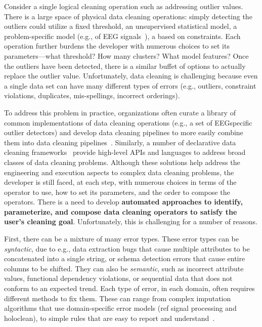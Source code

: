 Consider a single logical cleaning operation such as addressing outlier values.  There is a large space of physical data cleaning operations: simply detecting the outliers could utilize a fixed threshold, an unsupervised statistical model, a problem-specific model (e.g., of EEG signals~\cite{}), a based on constraints.  Each operation further burdens the developer with numerous choices to set its parameters---what threshold?  How many clusters? What model features?   Once the outliers have been detected, there is a similar buffet of options to actually replace the outlier value.     Unfortunately, data cleaning is challenging because even a single data set can have many different types of errors (e.g., outliers, constraint violations, duplicates, mis-spellings, incorrect orderings).

To address this problem in practice, organizations often curate a library of common implementations of data cleaning operations (e.g., a set of EEGspecific outlier detectors) and develop data cleaning pipelines to more easily combine them into data cleaning pipelines~\cite{krishnan2016hilda}.  Similarly, a number of declarative data cleaning frameworks~\cite{DBLP:journals/pvldb/HaasKWF015,gokhale2014corleone,stonebraker2013data,giannakopoulou2017cleanm} provide high-level APIs and languages to address broad classes of data cleaning problems.  Although these solutions help address the engineering and execution aspects to complex data cleaning problems, the developer is still faced, at each step, with numerous choices in terms of the operator to use, how to set its parameters, and the order to compose the operators.  There is a need to develop \textbf{automated approaches to identify, parameterize, and compose data cleaning operators to satisfy the user's cleaning goal}.  Unfortunately, this is challenging for a number of reasons.




First, there can be a mixture of many error types.    These error types can be {\it syntactic}, due to e.g., data extraction bugs that cause multiple attributes to be concatenated into a single string, or schema detection errors that cause entire columns to be shifted.  They can also be {\it semantic}, such as incorrect attribute values, functional dependency violations, or sequential data that does not conform to an expected trend.   Each type of error, in each domain, often requires different methods to fix them.  These can range from complex imputation algorithms that use domain-specific error models (ref signal processing and holoclean), to simple rules that are easy to report and understand~\cite{}.  

